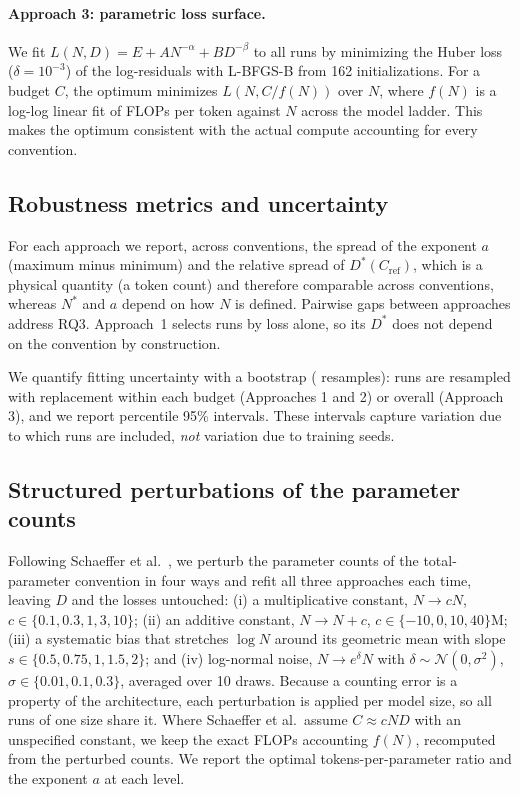 \paragraph{Approach 3: parametric loss surface.} We fit $L(N,D) = E + A N^{-\alpha} + B D^{-\beta}$ to all runs by minimizing the Huber loss ($\delta = 10^{-3}$) of the log-residuals with L-BFGS-B from 162 initializations. For a budget $C$, the optimum minimizes $L(N, C/f(N))$ over $N$, where $f(N)$ is a log-log linear fit of FLOPs per token against $N$ across the model ladder. This makes the optimum consistent with the actual compute accounting for every convention.

\subsection{Robustness metrics and uncertainty}
\label{sec:robust}
For each approach we report, across conventions, the spread of the exponent $a$ (maximum minus minimum) and the relative spread of $D^*(C_\text{ref})$, which is a physical quantity (a token count) and therefore comparable across conventions, whereas $N^*$ and $a$ depend on how $N$ is defined. Pairwise gaps between approaches address RQ3. Approach~1 selects runs by loss alone, so its $D^*$ does not depend on the convention by construction.

We quantify fitting uncertainty with a bootstrap ( resamples): runs are resampled with replacement within each budget (Approaches 1 and 2) or overall (Approach 3), and we report percentile 95\% intervals. These intervals capture variation due to which runs are included, \emph{not} variation due to training seeds.

\subsection{Structured perturbations of the parameter counts}
\label{sec:perturb}
Following Schaeffer et al.~\citep{schaeffer2025}, we perturb the parameter counts of the total-parameter convention in four ways and refit all three approaches each time, leaving $D$ and the losses untouched: (i) a multiplicative constant, $N\to cN$, $c\in\{0.1,0.3,1,3,10\}$; (ii) an additive constant, $N\to N+c$, $c\in\{-10,0,10,40\}$M; (iii) a systematic bias that stretches $\log N$ around its geometric mean with slope $s\in\{0.5,0.75,1,1.5,2\}$; and (iv) log-normal noise, $N\to e^{\delta}N$ with $\delta\sim\mathcal N(0,\sigma^2)$, $\sigma\in\{0.01,0.1,0.3\}$, averaged over 10 draws. Because a counting error is a property of the architecture, each perturbation is applied per model size, so all runs of one size share it. Where Schaeffer et al.\ assume $C\approx cND$ with an unspecified constant, we keep the exact FLOPs accounting $f(N)$, recomputed from the perturbed counts. We report the optimal tokens-per-parameter ratio and the exponent $a$ at each level.

